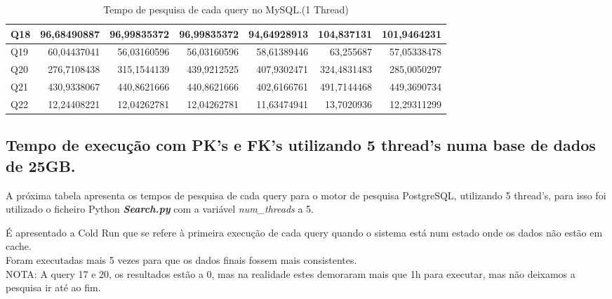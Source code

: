 \documentclass{article}
\begin{document}
\begin{table}[H]
{\begin{tabular}{|l|r|r|r|r|r|r|}
Q18&	96,68490887&	96,99835372&	96,99835372&	94,64928913	&104,837131	&101,9464231\\ \hline
Q19&	60,04437041&	56,03160596&	56,03160596&	58,61389446	&63,255687	&57,05338478\\ \hline
Q20&	276,7108438&	315,1544139&	439,9212525&	407,9302471	&324,4831483&	285,0050297\\ \hline
Q21&	430,9338067&	440,8621666&	440,8621666&	402,6166761	&491,7144468&	449,3690734 \\ \hline
Q22&	12,24408221&	12,04262781&	12,04262781&	11,63474941	&13,7020936	&12,29311299\\ \hline
    \end{tabular}}
    \caption{Tempo de pesquisa de cada query no MySQL.(1 Thread)}
    \label{tab:BC_Table3}
  \end{table}









\clearpage
\subsection{Tempo de execução com PK's e FK's utilizando 5 thread's numa base de dados de 25GB.}
\texttt{}\par A próxima tabela apresenta os tempos de pesquisa de cada query para o motor de pesquisa PostgreSQL, utilizando 5 thread's, para isso foi utilizado o ficheiro Python \textbf{\textit{Search.py}}  com a variável \textit{num\_threads} a 5. 
\texttt{}\par É apresentado a Cold Run que se refere à primeira execução de cada query quando o sistema está num estado onde os dados não estão em cache.\\
Foram executadas mais 5 vezes para que os dados finais fossem mais consistentes.\\
NOTA: A query 17 e 20, os resultados estão a 0, mas na realidade estes demoraram mais que 1h para executar, mas não deixamos a pesquisa ir até ao fim.
\end{document}
